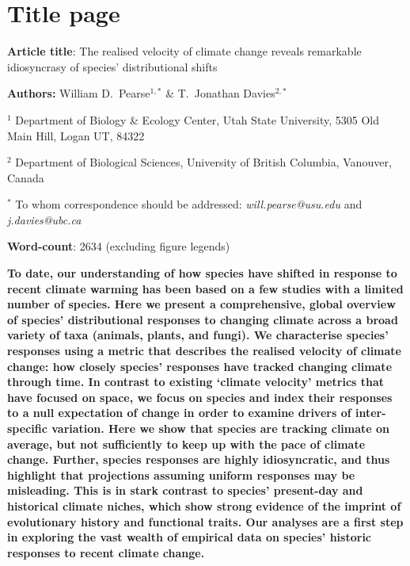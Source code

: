 \documentclass[12pt]{report}
\begin{document}

\section*{Title page}
\textbf{Article title}: The realised velocity of climate change
reveals remarkable idiosyncrasy of species' distributional shifts

\textbf{Authors:} William D.\ Pearse$^{1,*}$ \& T.\ Jonathan
Davies$^{2,*}$

$^1$ Department of Biology \& Ecology Center, Utah State University,
5305 Old Main Hill, Logan UT, 84322

$^2$ Department of Biological Sciences, University of British
Columbia, Vanouver, Canada

$^*$ To whom correspondence should be addressed:
\emph{will.pearse@usu.edu} and \emph{j.davies@ubc.ca}

\textbf{Word-count}: 2634 (excluding figure legends)

\clearpage
\textbf{To date, our understanding of how species have shifted in
  response to recent climate warming has been based on a few studies
  with a limited number of species. Here we present a comprehensive,
  global overview of species' distributional responses to changing
  climate across a broad variety of taxa (animals, plants, and
  fungi). We characterise species' responses using a metric that
  describes the realised velocity of climate change: how closely
  species' responses have tracked changing climate through time. In
  contrast to existing `climate velocity' metrics that have focused on
  space, we focus on species and index their responses to a null
  expectation of change in order to examine drivers of inter-specific
  variation. Here we show that species are tracking climate on
  average, but not sufficiently to keep up with the pace of climate
  change. Further, species responses are highly idiosyncratic, and
  thus highlight that projections assuming uniform responses may be
  misleading.  This is in stark contrast to species' present-day and
  historical climate niches, which show strong evidence of the imprint
  of evolutionary history and functional traits. Our analyses are a
  first step in exploring the vast wealth of empirical data on
  species' historic responses to recent climate change.}
\end{document}
